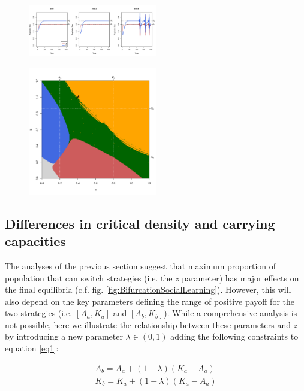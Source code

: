 \documentclass[review,authoryear]{elsarticle}
\begin{document}
\begin{figure}
  \centering
      \includegraphics[width=0.5\textwidth]{./figures/figure4b.pdf}
  \caption{}
    \label{fig:TSsocialLearning}
\end{figure}

\begin{figure}
  \centering
      \includegraphics[width=0.5\textwidth]{./figures/figureUnstable1.pdf}
  \caption{}
    \label{fig:basinunstable}
\end{figure}

\subsection{Differences in critical density and carrying capacities}

The analyses of the previous section suggest that maximum proportion of population that can switch strategies (i.e. the $z$ parameter) has major effects on the final equilibria (c.f. fig. \ref{fig:BifurcationSocialLearning}). %
However, this will also depend on the key parameters defining the range of positive payoff for the two strategies (i.e. $[A_a,K_a]$ and $[A_b,K_b]$). While a comprehensive analysis is not possible, here we illustrate the relationship between these parameters and $z$ by introducing a new parameter $\lambda \in (0,1)$ adding the following constraints to equation \eqref{eq1}: 

\begin{equation}
\begin{aligned}
\label{eqOverlap}
A_b = A_a + (1-\lambda)(K_a-A_a)\\
K_b = K_a + (1-\lambda)(K_a-A_a)
\end{aligned}
\end{equation}
\end{document}
